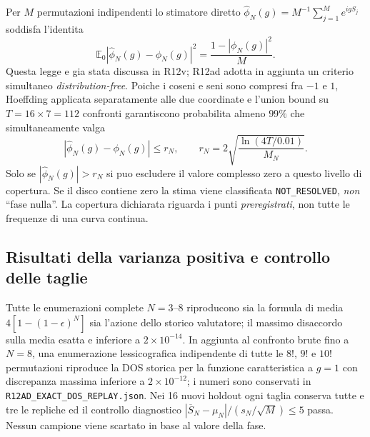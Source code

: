 \documentclass[11pt,a4paper]{article}
\begin{document}
Per $M$ permutazioni indipendenti lo stimatore diretto $\widehat\phi_N(g)=M^{-1}\sum_{j=1}^M e^{igS_j}$ soddisfa l'identita
\begin{equation}
 \mathbb E_0|\widehat\phi_N(g)-\phi_N(g)|^2
 =\frac{1-|\phi_N(g)|^2}{M}.
 \label{eq:r12ad_phase_mse}
\end{equation}
Questa legge e gia stata discussa in R12v; R12ad adotta in aggiunta un criterio simultaneo \emph{distribution-free}. Poiche i coseni e seni sono compresi fra $-1$ e $1$, Hoeffding applicata separatamente alle due coordinate e l'union bound su $T=16\times7=112$ confronti garantiscono probabilita almeno $99\%$ che simultaneamente valga
\begin{equation}
 \boxed{|\widehat\phi_N(g)-\phi_N(g)|\le r_N,
 \qquad r_N=2\sqrt{\frac{\ln(4T/0.01)}{M_N}}.}
 \label{eq:r12ad_hoeffding_disk}
\end{equation}
Solo se $|\widehat\phi_N(g)|>r_N$ si puo escludere il valore complesso zero a questo livello di copertura. Se il disco contiene zero la stima viene classificata \texttt{NOT\_RESOLVED}, \emph{non} ``fase nulla''. La copertura dichiarata riguarda i punti \emph{preregistrati}, non tutte le frequenze di una curva continua.

\subsection{Risultati della varianza positiva e controllo delle taglie}

Tutte le enumerazioni complete $N=3$--$8$ riproducono sia la formula di media $4[1-(1-\epsilon)^N]$ sia l'azione dello storico valutatore; il massimo disaccordo sulla media esatta e inferiore a $2\times10^{-14}$. In aggiunta al confronto brute fino a $N=8$, una enumerazione lessicografica indipendente di tutte le $8!$, $9!$ e $10!$ permutazioni riproduce la DOS storica per la funzione caratteristica a $g=1$ con discrepanza massima inferiore a $2\times10^{-12}$; i numeri sono conservati in \texttt{R12AD\_EXACT\_DOS\_REPLAY.json}. Nei 16 nuovi holdout ogni taglia conserva tutte e tre le repliche ed il controllo diagnostico $|\overline S_N-\mu_N|/(s_N/\sqrt M)\le5$ passa. Nessun campione viene scartato in base al valore della fase.
\end{document}
